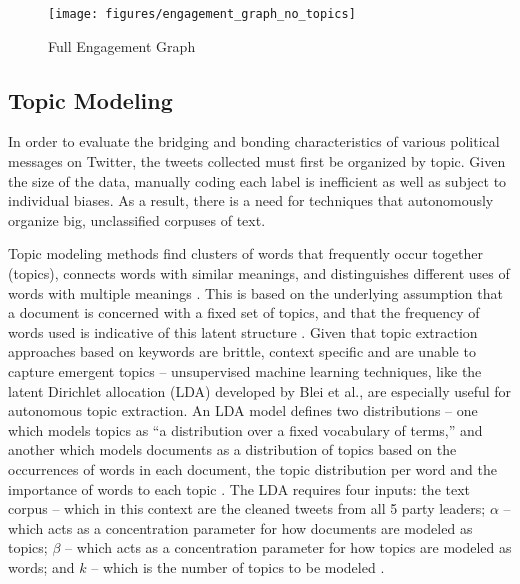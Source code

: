 \begin{figure}[h!]
  \centering
  \texttt{[image: figures/engagement\_graph\_no\_topics]}
  \caption[Full Engagement Graph]{Full Engagement Graph}
  \label{fig:engagement_graph_no_topics}
\end{figure}

\subsection{Topic Modeling}

In order to evaluate the bridging and bonding characteristics of various
political messages on Twitter, the tweets collected must first be organized by
topic. Given the size of the data, manually coding each label is inefficient as
well as subject to individual biases. As a result, there is a need for
techniques that autonomously organize big, unclassified corpuses of text. 

Topic modeling methods find clusters of words that frequently occur together
(topics), connects words with similar meanings, and distinguishes different uses
of words with multiple meanings \cite{alghamdi2015survey}. This is based on the
underlying assumption that a document is concerned with a fixed set of topics,
and that the frequency of words used is indicative of this latent structure
\cite{blei2003latent}. Given that topic extraction approaches based on keywords
are brittle, context specific and are unable to capture emergent topics --
unsupervised machine learning techniques, like the latent Dirichlet allocation
(LDA) developed by Blei et al., are especially useful for autonomous topic
extraction. An LDA model defines two distributions -- one which models topics as
``a distribution over a fixed vocabulary of terms,'' and another which models
documents as a distribution of topics based on the occurrences of words in each
document, the topic distribution per word and the importance of words to each
topic \cite{blei2003latent}. The LDA requires four inputs: the text corpus --
which in this context are the cleaned tweets from all 5 party leaders; $\alpha$
-- which acts as a concentration parameter for how documents are modeled as
topics; $\beta$ -- which acts as a concentration parameter for how topics are
modeled as words; and $k$ -- which is the number of topics to be modeled
\cite{blei2003latent}.

